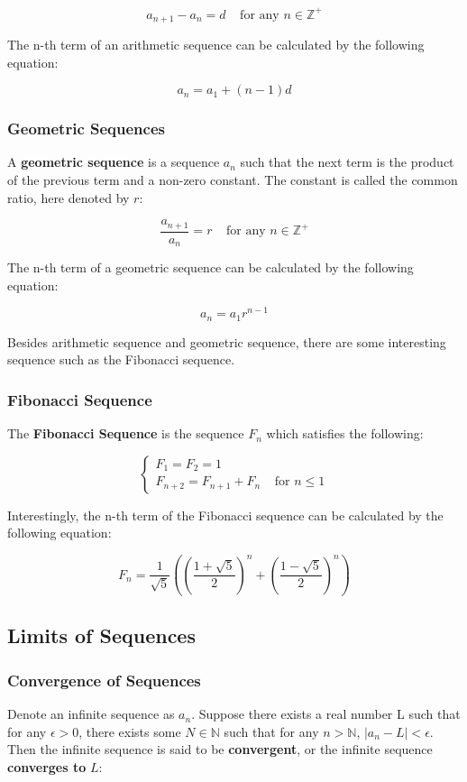 \documentclass[a4paper,12pt]{article}
\newcommand{\s}{\vspace{1mm}}
\newcommand{\N}{\mathbb{N}}
\newcommand{\Z}{\mathbb{Z}}
\begin{document}
$$a_{n+1}-a_{n}=d\;\;\;\;\text{for any }n\in \Z^{+}$$\s

The n-th term of an arithmetic sequence can be calculated by the following equation:

$$a_{n}=a_{1}+(n-1)d$$

\subsubsection{Geometric Sequences}
A \textbf{geometric sequence} is a sequence $a_{n}$ such that the next term is the product of the previous term and a non-zero constant. The constant is called the common ratio, here denoted by $r$:

$$\frac{a_{n+1}}{a_{n}}=r\;\;\;\;\text{for any }n\in \Z^{+}$$\s

The n-th term of a geometric sequence can be calculated by the following equation:

$$a_{n}=a_{1}r^{n-1}$$\s

Besides arithmetic sequence and geometric sequence, there are some interesting sequence such as the Fibonacci sequence.

\subsubsection{Fibonacci Sequence}
The \textbf{Fibonacci Sequence} is the sequence $F_{n}$ which satisfies the following:

$$\left\{\begin{matrix}
  F_{1}=F_{2}=1 \\
  F_{n+2}=F_{n+1}+F_{n}\;\;\;\;\text{for }n\leq 1
\end{matrix}\right.$$
\pagebreak

Interestingly, the n-th term of the Fibonacci sequence can be calculated by the following equation:

$$F_{n}=\frac{1}{\sqrt{5}}\left( \left( \frac{1+\sqrt{5}}{2}\right) ^{n}+\left( \frac{1-\sqrt{5}}{2}\right) ^{n}\right)$$

\subsection{Limits of Sequences}
\subsubsection{Convergence of Sequences}
Denote an infinite sequence as $a_{n}$. Suppose there exists a real number L such that for any $\epsilon>0$, there exists some $N\in \N$ such that for any $n>\N$, $\left| a_{n}-L\right| <\epsilon$. Then the infinite sequence is said to be \textbf{convergent}, or the infinite sequence \textbf{converges to} $L$:
\end{document}
